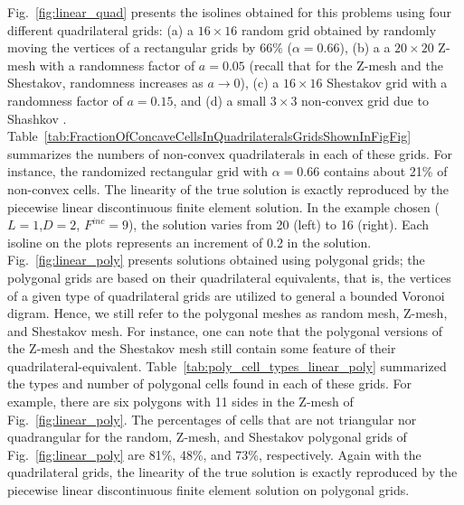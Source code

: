\documentclass[preprint,10pt]{elsarticle}
\newcommand{\fig}[1]{Fig.~\ref{#1}}                      %
\newcommand{\tbl}[1]{Table~\ref{#1}}                     %
\begin{document}
\fig{fig:linear_quad} presents the isolines obtained for this problems using four different quadrilateral grids:
(a) a $16 \times 16$ random grid obtained by randomly moving the vertices of a rectangular grids by 66\% ($\alpha=0.66$), 
(b) a a $20 \times 20$ Z-mesh with a randomness factor of $a=0.05$ (recall that for the Z-mesh and the Shestakov, randomness increases
as $a\to 0$), 
(c) a $16 \times 16$ Shestakov grid  with a randomness factor of $a=0.15$, and 
(d) a small  $3 \times 3$ non-convex grid due to Shashkov \cite{shashkov}.
\tbl{tab:FractionOfConcaveCellsInQuadrilateralsGridsShownInFigFig} summarizes the numbers of non-convex quadrilaterals in each of these grids.  For instance, the randomized rectangular grid with $\alpha=0.66$ contains about 21\% of non-convex cells. 
The linearity of the true solution is exactly reproduced by the piecewise linear discontinuous finite element solution. In the example chosen ($L=1$,$D=2$, $F^{inc}=9$), the solution varies from 20 (left) to 16 (right). Each isoline on the plots represents an increment of 0.2 in the solution.
%
\fig{fig:linear_poly} presents solutions obtained using polygonal grids; the polygonal grids are based on their quadrilateral equivalents, that is, the vertices of a given type of quadrilateral grids are utilized to general a bounded Voronoi digram. Hence, we still refer to the polygonal meshes as random mesh, Z-mesh, and Shestakov mesh. For instance, one can note that the polygonal versions of the Z-mesh and the Shestakov mesh still contain some feature of their quadrilateral-equivalent. \tbl{tab:poly_cell_types_linear_poly} summarized the types and number of polygonal cells found in each of these grids. 
For example, there are six polygons with 11 sides in the Z-mesh of \fig{fig:linear_poly}. The percentages of cells that are not triangular nor quadrangular for the random, Z-mesh, and Shestakov polygonal grids of \fig{fig:linear_poly} are 81\%, 48\%, and 73\%, respectively. Again with the quadrilateral grids,  the linearity of the true solution is exactly reproduced by the piecewise linear discontinuous finite element solution on polygonal grids.
\end{document}
